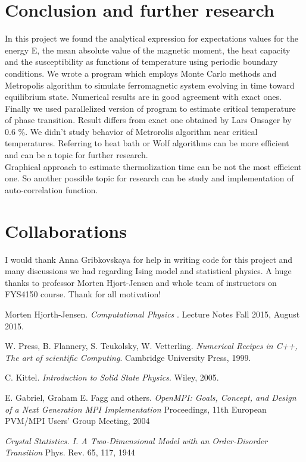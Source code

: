 \documentclass[10pt]{article}
\begin{document}
\clearpage





\section{Conclusion and further research}\label{conc}
In this project we found the analytical expression for expectations values
for the energy E, the mean absolute value of the magnetic moment, the heat capacity and the
susceptibility as functions of temperature using periodic boundary conditions.
We wrote a program which employs Monte Carlo methods and Metropolis algorithm to simulate ferromagnetic system evolving in time toward equilibrium state.
Numerical results are in good agreement with exact ones.
Finally we used parallelized version of program to estimate critical temperature of phase transition. Result differs from exact one obtained by Lars Onsager \cite{Onsager} by 0.6 \%.
We didn't study behavior of Metrorolis algorithm near critical temperatures. Referring to \cite{one} heat bath or Wolf algorithms can be more efficient and can be a topic for further research.\\
Graphical approach to estimate thermolization time can be not the most efficient one. So another possible topic for research can be study and implementation of auto-correlation function.
\section{Collaborations}
I would thank Anna Gribkovskaya for help in writing code for this project and many discussions we had regarding Ising model and statistical physics.
A huge thanks to professor Morten Hjort-Jensen and whole team of instructors on FYS4150 course. Thank for all motivation! 
\newpage
\begin{thebibliography}{2}
Morten Hjorth-Jensen. 
\textit{Computational Physics
}. 
Lecture Notes Fall 2015, August 2015.

W. Press, B. Flannery, S. Teukolsky, W. Vetterling. 
\textit{Numerical Recipes in C++, The art of scientific Computing}. 
Cambridge University Press, 1999.

C. Kittel. 
\textit{Introduction to Solid State Physics}. 
Wiley, 2005.

E. Gabriel,  Graham E. Fagg and others.
\textit{OpenMPI: Goals, Concept, and Design of a Next Generation MPI Implementation}
Proceedings, 11th European PVM/MPI Users' Group Meeting, 2004


\textit{Crystal Statistics. I. A Two-Dimensional Model with an Order-Disorder Transition}
Phys. Rev. 65, 117, 1944
\end{thebibliography}
\end{document}
